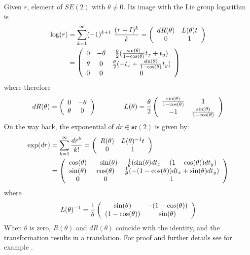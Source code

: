 Given $r$, element of $SE(2)$ with $\theta\neq 0$. Its image with the Lie group logarithm is
\begin{align*}
\log(r)
&=
\sum_{k=1}^{\infty} (-1)^{k+1}~\frac{(r - I)^k}{k}
=
\left (
\begin{array} {c c }
dR(\theta) & L(\theta)t \\
0 & 1 
\end{array}
\right )
\\
&=
\left (
\begin{array} {c c c}
0   & - \theta& \frac{\theta}{2} (\frac{\sin(\theta)}{1-\cos(\theta)} t_x + t_y )\\
\theta & 0     & \frac{\theta}{2} (- t_x + \frac{\sin(\theta)}{1-\cos(\theta)} t_y )\\
0 & 0 &  0
\end{array}
\right )
\end{align*}
where therefore 
\begin{align*}
dR(\theta) = 
\left (
\begin{array} {c c }
0 & -\theta \\
\theta & 0 
\end{array}
\right )
\qquad \qquad 
L(\theta) = 
\frac{\theta}{2}
\left (
\begin{array} {c c }
\frac{\sin(\theta)}{1-\cos(\theta)} & 1 \\
-1 & \frac{\sin(\theta)}{1-\cos(\theta)}
\end{array}
\right )
\end{align*}
On the way back, the exponential of $dr \in \mathfrak{se}(2)$ is given by:
\begin{align*}
\exp(dr)
&=
\sum_{k=1}^{\infty} \frac{dr^{k}}{k!}
=
\left (
\begin{array} {c c }
R(\theta) & L(\theta)^{-1}t \\
0 & 1 
\end{array}
\right )
\\
&=
\left (
\begin{array} {c c c}
\cos(\theta)   & - \sin(\theta)& \frac{1}{\theta} (\sin(\theta)dt_x - (1-\cos(\theta)) dt_y )\\
\sin(\theta) & \cos(\theta)     & \frac{1}{\theta} (- (1-\cos(\theta))dt_x + \sin(\theta) dt_y )\\
0 & 0 &  1
\end{array}
\right )
\end{align*}
where
\begin{align*}
L(\theta)^{-1} = 
\frac{1}{\theta}
\left (
\begin{array} {c c }
\sin(\theta) & -(1-\cos(\theta)) \\
(1-\cos(\theta)) & \sin(\theta)
\end{array}
\right )
\end{align*}
When $\theta$ is zero, $R(\theta)$ and $dR(\theta)$ coincide with the identity, and the transformation results in a translation. For proof and further details see for example \cite{gallier2011geometric} \cite{hall2015lie}.\\

